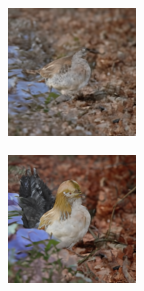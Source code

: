 \documentclass{article}
\begin{document}
\begin{figure}
\begin{subfigure}[b]{0.5\linewidth}
\begin{subfigure}[b]{0.242\linewidth}
        \end{subfigure}
        \hfill
    \end{subfigure}%
    \begin{subfigure}[b]{0.5\linewidth}
        \begin{subfigure}[b]{0.242\linewidth}
        \includegraphics[width=\linewidth]{figures/imagenet128/solver_samples/imagenet128_fm_ot_53_05.png}
        \end{subfigure}
        \begin{subfigure}[b]{0.242\linewidth}
        \includegraphics[width=\linewidth]{figures/imagenet128/solver_samples/imagenet128_fm_ot_53_10.png}

\end{subfigure}
\end{subfigure}
\end{figure}
\end{document}
